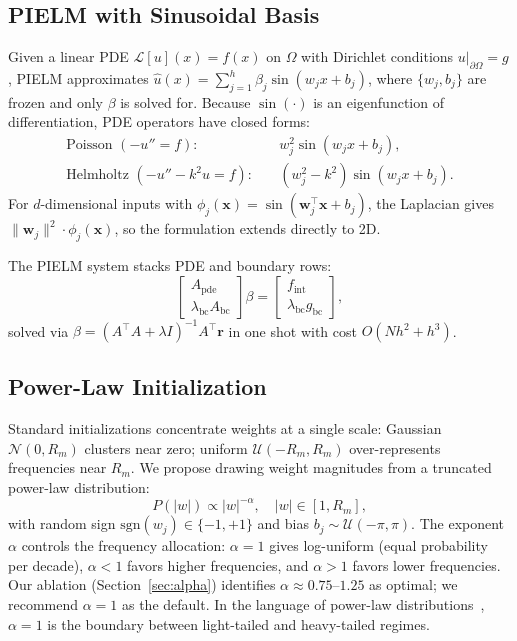\documentclass[final,12pt,3p,times,fleqn]{elsarticle}
\begin{document}
\subsection{PIELM with Sinusoidal Basis}

Given a linear PDE $\mathcal{L}[u](x) = f(x)$ on $\Omega$ with Dirichlet conditions $u|_{\partial\Omega} = g$, PIELM approximates $\hat{u}(x) = \sum_{j=1}^{h} \beta_j \sin(w_j x + b_j)$, where $\{w_j, b_j\}$ are frozen and only $\beta$ is solved for. Because $\sin(\cdot)$ is an eigenfunction of differentiation, PDE operators have closed forms:
\begin{align}
    \text{Poisson } (-u'' = f): &\quad w_j^2 \sin(w_j x + b_j), \label{eq:poisson}\\
    \text{Helmholtz } (-u'' - k^2 u = f): &\quad (w_j^2 - k^2) \sin(w_j x + b_j). \label{eq:helmholtz}
\end{align}
For $d$-dimensional inputs with $\phi_j(\mathbf{x}) = \sin(\mathbf{w}_j^\top \mathbf{x} + b_j)$, the Laplacian gives $\|\mathbf{w}_j\|^2 \cdot \phi_j(\mathbf{x})$, so the formulation extends directly to 2D.

The PIELM system stacks PDE and boundary rows:
\begin{equation}\label{eq:system}
    \begin{bmatrix} A_{\text{pde}} \\ \lambda_{\text{bc}} A_{\text{bc}} \end{bmatrix} \beta =
    \begin{bmatrix} f_{\text{int}} \\ \lambda_{\text{bc}} g_{\text{bc}} \end{bmatrix},
\end{equation}
solved via $\beta = (A^\top A + \lambda I)^{-1} A^\top \mathbf{r}$ in one shot with cost $O(Nh^2 + h^3)$.

\subsection{Power-Law Initialization}

Standard initializations concentrate weights at a single scale: Gaussian $\mathcal{N}(0, R_m)$ clusters near zero; uniform $\mathcal{U}(-R_m, R_m)$ over-represents frequencies near $R_m$. We propose drawing weight magnitudes from a truncated power-law distribution:
\begin{equation}\label{eq:powerlaw}
    P(|w|) \propto |w|^{-\alpha}, \quad |w| \in [1, R_m],
\end{equation}
with random sign $\text{sgn}(w_j) \in \{-1, +1\}$ and bias $b_j \sim \mathcal{U}(-\pi, \pi)$. The exponent $\alpha$ controls the frequency allocation: $\alpha = 1$ gives log-uniform (equal probability per decade), $\alpha < 1$ favors higher frequencies, and $\alpha > 1$ favors lower frequencies. Our ablation (Section~\ref{sec:alpha}) identifies $\alpha \approx 0.75$--$1.25$ as optimal; we recommend $\alpha = 1$ as the default. In the language of power-law distributions~\cite{clauset2009powerlaw}, $\alpha = 1$ is the boundary between light-tailed and heavy-tailed regimes.
\end{document}
